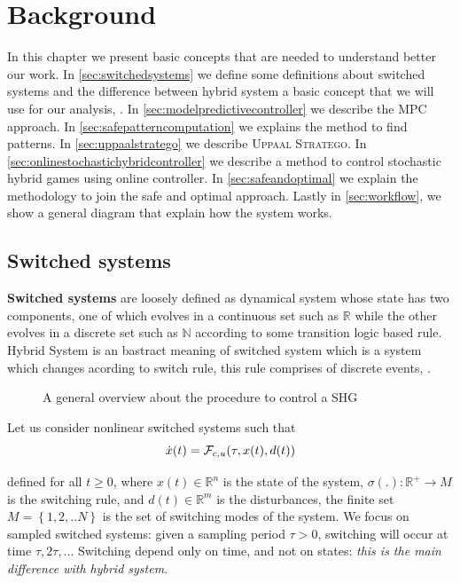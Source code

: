 \chapter{Background}
\label{ch:background}
In this chapter we present basic concepts that are needed to understand better
our work. In \autoref{sec:switchedsystems} we define some definitions about switched systems 
and the difference between hybrid system a basic concept that we will use for our
analysis, \cite{sanfelice2020hybrid}. In \autoref{sec:modelpredictivecontroller} we 
describe the \ac{MPC} approach. In \autoref{sec:safepatterncomputation} we explains
the method to find patterns. In \autoref{sec:uppaalstratego} we describe 
\textsc{Uppaal Stratego}. In \autoref{sec:onlinestochastichybridcontroller} we describe
a method to control stochastic hybrid games using online controller. In \autoref{sec:safeandoptimal}
we explain the methodology to join the safe and optimal approach. Lastly in 
\autoref{sec:workflow}, we show a general diagram that explain how the system works.
\clearpage
\section{Switched systems}
\label{sec:switchedsystems}
    \textbf{Switched systems} are loosely defined as dynamical 
    system whose state has two components, one of which evolves 
    in a continuous set such as $\mathbb{R}$  while the other 
    evolves in a discrete set such as $\mathbb{N}$ according to 
    some transition logic based rule. Hybrid System is an bastract 
    meaning of switched system which is a system which changes 
    acording to switch rule, this rule comprises of discrete events, 
    \citep{branicky1994stability}.
    \begin{figure}[!hbt]
      \centering
      
      \captionsetup{format=hang}
      \caption{A general overview about the procedure to control a \ac{SHG}}
      \label{fig:switchedsystem}
    \end{figure}
    Let us consider nonlinear switched systems such that
    \begin{equation}        
        \dot x(t) = \mathcal{F}_{c,u}(\tau,x(t),d(t)) \\
    \end{equation}

    defined for all $t \geqslant 0$, where $x(t) \in \mathbb{R}^n$ is the state
    of the system, $\sigma(.): \mathbb{R}^+ \rightarrow M$ is the switching 
    rule, and $d(t) \in \mathbb{R}^m$ is the disturbances, the finite
    set $M= \left\lbrace 1,2,.. N \right\rbrace$ is the set of switching
    modes of the system. We focus on sampled switched systems: given a sampling
    period $\tau > 0$, switching will occur at time $\tau, 2\tau, ...$ Switching 
    depend only on time, and not on states: \emph{this is the main difference with 
    hybrid system}.

